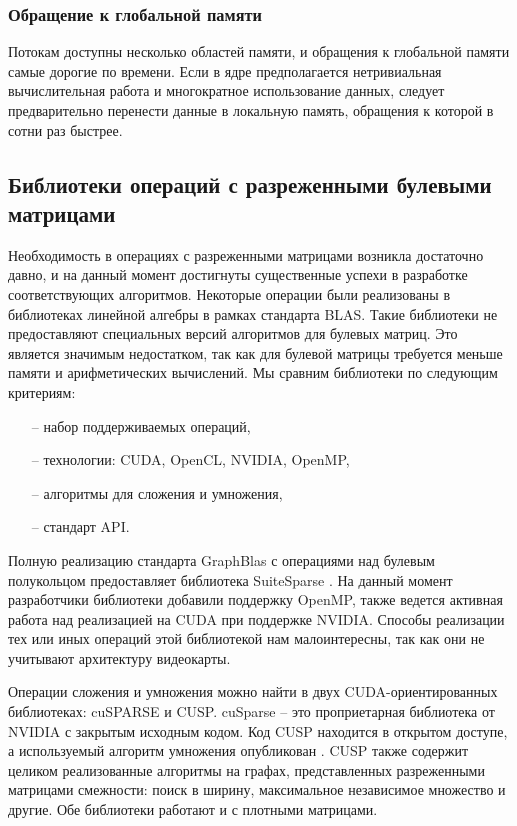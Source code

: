 \documentclass[14pt]{extarticle}
\begin{document}
	\subsubsection*{Обращение к глобальной памяти}
	
	Потокам доступны несколько областей памяти, и обращения к глобальной памяти самые дорогие по времени. Если в ядре предполагается нетривиальная вычислительная работа и многократное использование данных, следует предварительно перенести данные в локальную память, обращения к которой в сотни раз быстрее. 
	
	\subsection{Библиотеки  операций с разреженными булевыми матрицами}\label{libs}
	
	Необходимость в операциях с разреженными матрицами возникла достаточно давно, и на данный момент достигнуты существенные успехи в разработке соответствующих алгоритмов. Некоторые операции были реализованы в библиотеках линейной алгебры в рамках стандарта BLAS. Такие библиотеки не предоставляют специальных версий алгоритмов для булевых матриц. Это является значимым недостатком, так как для булевой матрицы требуется меньше памяти и арифметических вычислений. Мы сравним библиотеки по следующим критериям:
	\begin{enumerate}[itemsep=0mm, topsep=0pt]
		\item[--] набор поддерживаемых операций,
		\item[--] технологии: CUDA, OpenCL, NVIDIA, OpenMP,
		\item[--] алгоритмы для сложения и умножения,
		\item[--] стандарт API.
	\end{enumerate}
	
	Полную реализацию стандарта GraphBlas с операциями над булевым полукольцом предоставляет библиотека SuiteSparse \cite{suite_sparse}. На данный момент разработчики библиотеки добавили поддержку OpenMP, также ведется активная работа над реализацией на CUDA при поддержке NVIDIA. Способы реализации тех или иных операций этой библиотекой нам малоинтересны, так как они не учитывают архитектуру видеокарты.
	
	Операции сложения и умножения можно найти в двух CUDA-ориентированных библиотеках: cuSPARSE и CUSP. cuSparse -- это проприетарная библиотека от NVIDIA с закрытым исходным кодом. Код CUSP находится в открытом доступе, а используемый алгоритм умножения опубликован \cite{dalton}. CUSP также содержит целиком реализованные алгоритмы на графах, представленных разреженными матрицами смежности: поиск в ширину, максимальное независимое множество и другие. Обе библиотеки работают и с плотными матрицами. 
	
\end{document}
